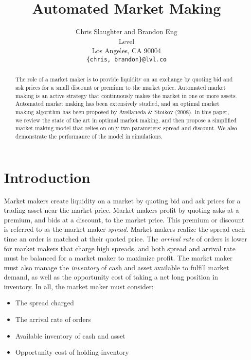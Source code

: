 \documentclass{article}
\title{Automated Market Making}
\author{
  Chris Slaughter and Brandon Eng \\
  Level\\
  Los Angeles, CA 90004 \\
  \texttt{\{chris, brandon\}@lvl.co}
}
\begin{document}
\maketitle

\begin{abstract}

The role of a market maker is to provide liquidity on an exchange by quoting bid and ask prices for a small discount or premium to the market price. Automated market making is an active strategy that continuously makes the market in one or more assets. Automated market making has been extensively studied, and an optimal market making algorithm has been proposed by Avellaneda \& Stoikov (2008). In this paper, we review the state of the art in optimal market making, and then propose a simplified market making model that relies on only two parameters: spread and discount. We also demonstrate the performance of the model in simulations.

\end{abstract}


\section{Introduction}
\label{sec:intro}

Market makers create liquidity on a market by quoting bid and ask prices for a trading asset near the market price. Market makers profit by quoting asks at a premium, and bids at a discount, to the market price. This premium or discount is referred to as the market maker \emph{spread}. Market makers realize the spread each time an order is matched at their quoted price. The \emph{arrival rate} of orders is lower for market makers that charge high spreads, and both spread and arrival rate must be balanced for a market maker to maximize profit. The market maker must also manage the \emph{inventory} of cash and asset available to fulfill market demand, as well as the opportunity cost of taking a net long position in inventory. In all, the market maker must consider:

\begin{itemize}
	\item The spread charged
	\item The arrival rate of orders
	\item Available inventory of cash and asset
	\item Opportunity cost of holding inventory
\end{itemize}
\end{document}
